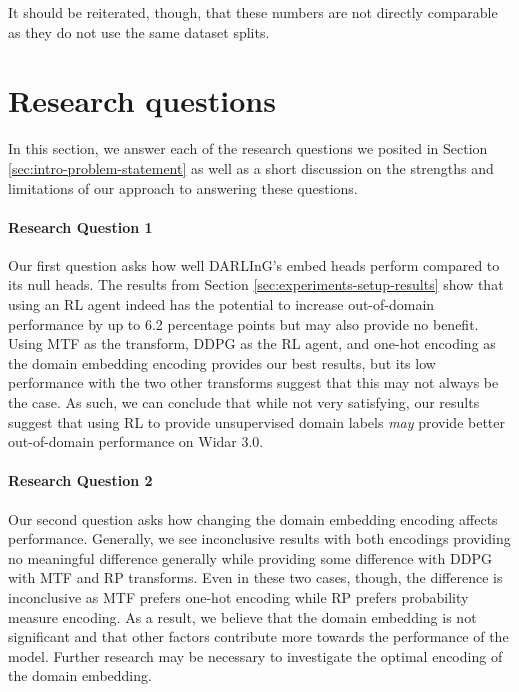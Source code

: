 It should be reiterated, though, that these numbers are not directly comparable as they do not use the same dataset splits.

\section{Research questions}

In this section, we answer each of the research questions we posited in Section \ref{sec:intro-problem-statement} as well as a short discussion on the strengths and limitations of our approach to answering these questions.

\paragraph{Research Question 1}
Our first question asks how well DARLInG's embed heads perform compared to its null heads.
The results from Section \ref{sec:experiments-setup-results} show that using an RL agent indeed has the potential to increase out-of-domain performance by up to 6.2 percentage points but may also provide no benefit.
Using MTF as the transform, DDPG as the RL agent, and one-hot encoding as the domain embedding encoding provides our best results, but its low performance with the two other transforms suggest that this may not always be the case.
As such, we can conclude that while not very satisfying, our results suggest that using RL to provide unsupervised domain labels \textit{may} provide better out-of-domain performance on Widar 3.0.

\paragraph{Research Question 2}
Our second question asks how changing the domain embedding encoding affects performance.
Generally, we see inconclusive results with both encodings providing no meaningful difference generally while providing some difference with DDPG with MTF and RP transforms.
Even in these two cases, though, the difference is inconclusive as MTF prefers one-hot encoding while RP prefers probability measure encoding.
As a result, we believe that the domain embedding is not significant and that other factors contribute more towards the performance of the model.
Further research may be necessary to investigate the optimal encoding of the domain embedding.

